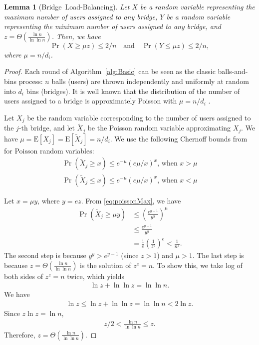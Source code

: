 \documentclass[USenglish,oneside,twocolumn]{article}
\newcommand{\E}{\mathbf{\mathrm{E}}}
\newtheorem{lemma}{Lemma}
\newcommand{\sfsize}{\fontsize{0.68\baselineskip}{0.68\baselineskip}\selectfont}
\newcommand{\sans}[1]{\textsf{\sfsize \mbox{#1}}}
\begin{document}
\begin{lemma}[\sans{Bridge Load-Balancing}]
	Let $X$ be a random variable representing the maximum number of users assigned to any bridge, $Y$ be a random variable representing the minimum number of users assigned to any bridge, and $z = \Theta\left(\frac{\ln{n}}{\ln{\ln{n}}}\right)$. Then, we have 
	\[
	\Pr\left(X \geq \mu z\right) \leq 2/n \quad \text{and} \quad 
	\Pr\left(Y \leq \mu z\right) \leq 2/n,
	\]
	where ${\mu = n/d_i}$.
\end{lemma}
\begin{proof}
	Each round of Algorithm~\ref{alg:Basic} can be seen as the classic balls-and-bins process: $n$ balls (users) are thrown independently and uniformly at random into $d_i$ bins (bridges). It is well known that the distribution of the number of users assigned to a bridge is approximately Poisson with ${\mu = n/d_i}$ \cite[Chapter~5]{Michael2005}.
	
	Let $X_j$ be the random variable corresponding to the number of users assigned to the $j$-th bridge, and let $\tilde{X}_j$ be the Poisson random variable approximating $X_j$. We have ${\mu = \E[X_j] = \E[\tilde{X}_j] = n/d_i}$. We use the following Chernoff bounds from \cite[Chapter~5]{Michael2005} for Poisson random variables:
	\begin{align}
		\Pr(\tilde{X}_j \geq x) \leq e^{-\mu}(e\mu/x)^x \text{, when } x > \mu \label{eq:poissonMax}\\
		\Pr(\tilde{X}_j \leq x) \leq e^{-\mu}(e\mu/x)^x \text{, when } x < \mu \label{eq:poissonMin}
	\end{align}
	
	\noindent Let ${x = \mu y}$, where ${y = ez}$. From \eqref{eq:poissonMax}, we have
	\begin{align}
		\Pr(\tilde{X}_j \geq \mu y) &\leq \left(\frac{e^{y-1}}{y^y}\right)^\mu \nonumber \\
		&\leq \frac{e^{y-1}}{y^y} \nonumber \\ 
		&= \frac{1}{e}\left(\frac{1}{z^z}\right)^e < \frac{1}{n^2}. \label{eq:approxBound}
	\end{align}
	The second step is because ${y^y > e^{y-1}}$ (since ${z > 1}$) and ${\mu > 1}$. The last step is because ${z = \Theta\left(\frac{\ln{n}}{\ln{\ln{n}}}\right)}$ is the solution of ${z^z = n}$. To show this, we take log of both sides of ${z^z = n}$ twice, which yields
	\begin{align*}
		\ln{z} + \ln{\ln{z}} = \ln{\ln{n}}.
	\end{align*}
	We have
	\begin{align*}
		\ln{z} \leq \ln{z} + \ln{\ln{z}} = \ln{\ln{n}} < 2\ln{z}.
	\end{align*}
	Since $z\ln{z} = \ln{n}$,
	\begin{align*}
		z/2 < \frac{\ln{n}}{\ln{\ln{n}}} \leq z.
	\end{align*}
	Therefore, $z = \Theta\left(\frac{\ln{n}}{\ln{\ln{n}}}\right)$. 
	

\end{proof}
\end{document}
